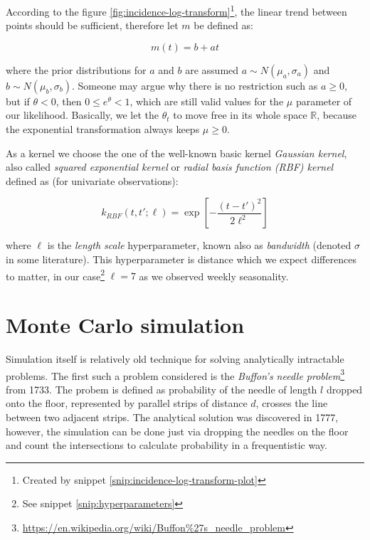 \documentclass[
  digital, %
  oneside, %
  lof,     %
  lot,     %
]{fithesis4}
\begin{document}
According to the figure \ref{fig:incidence-log-transform}\footnote{Created by snippet \ref{snip:incidence-log-transform-plot}}, 
the linear trend between points should be sufficient, 
therefore let $m$ be defined as:

\begin{equation}
m(t) = b + a t
\end{equation}

where the prior distributions for $a$ and $b$ 
are assumed 
$a \sim N \left( \mu_a, \sigma_a \right)$ and 
$b \sim N \left( \mu_b, \sigma_b \right)$.
Someone may argue why there is no restriction such as
$a \geq 0$, but if $\theta < 0$, then $0 \leq e^{\theta} < 1$, 
which are still valid values for the $\mu$ parameter
of our likelihood.
Basically, we let the $\theta_t$ to move
free in its whole space $\mathbb{R}$, because the
exponential transformation always keeps $\mu \geq 0$.

As a kernel we choose 
the one of the well-known basic kernel \textit{Gaussian kernel}, 
also called \textit{squared exponential kernel} or 
\textit{radial basis function (RBF) kernel} defined as
(for univariate observations):

\begin{equation}
k_{RBF} \left( t, t'; \ell \right) = \exp \left[ -\frac{(t - t')^2}{2\ell^2} \right]
\end{equation}

where $\ell$ is the \textit{length scale} hyperparameter, 
known also as \textit{bandwidth} (denoted $\sigma$ in some literature). 
This hyperparameter is distance which we expect 
differences to matter, in our case\footnote{See snippet \ref{snip:hyperparameters}} $\ell = 7$ as 
we observed weekly seasonality.


\section{Monte Carlo simulation}
\label{sec:monte-carlo}

Simulation itself is relatively old technique for 
solving analytically intractable problems. 
The first such a problem considered is the 
\textit{Buffon's needle problem}\footnote{\url{https://en.wikipedia.org/wiki/Buffon\%27s_needle_problem}} from 1733. 
The probem is defined as probability of the 
needle of length $l$ dropped onto the floor, 
represented by parallel strips of distance 
$d$, crosses the line between two adjacent 
strips.
The analytical solution was discovered in 1777, 
however, the simulation can be done just via 
dropping the needles on the floor and count 
the intersections to calculate probability 
in a frequentistic way.
\end{document}
